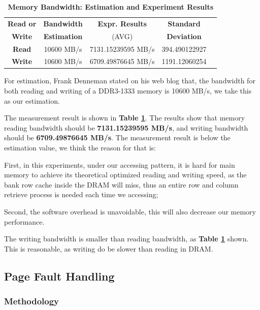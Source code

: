 \begin{table}[ht]
  \centering
  \caption{\textbf{Memory Bandwidth: Estimation and Experiment Results}}
  \begin{threeparttable}
  \begin{tabular}{ccccc}
  \hline
      \textbf{Read or} & \textbf{Bandwidth}   & \textbf{Expr. Results} & \textbf{Standard}\\
      \textbf{Write}   & \textbf{Estimation}  & (AVG)   & \textbf{Deviation} \\
  \hline
      \textbf{Read}  & 10600 MB/s & 7131.15239595 MB/s & 394.490122927  \\
      \textbf{Write} & 10600 MB/s & 6709.49876645 MB/s & 1191.12060254  \\
  \hline
  \end{tabular}
  \end{threeparttable}
  \label{memory_bandwidth_table}
\end{table}

For estimation, Frank Denneman stated on his web blog \cite{frankdenneman} that, the bandwidth for both reading and writing of a DDR3-1333 memory is 10600 MB/s, we take this as our estimation.

The measurement result is shown in \textbf{Table \ref{memory_bandwidth_table}}. The results show that memory reading bandwidth should be \textbf{7131.15239595 MB/s}, and writing bandwidth should be \textbf{6709.49876645 MB/s}. The measurement result is below the estimation value, we think the reason for that is:

First, in this experiments, under our accessing pattern, it is hard for main memory to achieve its theoretical optimized reading and writing speed, as the bank row cache inside the DRAM will miss, thus an entire row and column retrieve process is needed each time we accessing;

Second, the software overhead is unavoidable, this will also decrease our memory performance.

The writing bandwidth is smaller than reading bandwidth, as \textbf{Table \ref{memory_bandwidth_table}} shown. This is reasonable, as writing do be slower than reading in DRAM.

\subsection{Page Fault Handling}

\subsubsection{Methodology}

